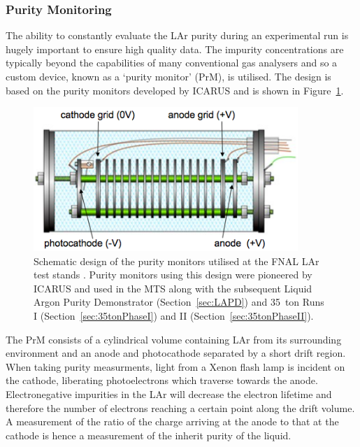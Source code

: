 \subsubsection{Purity Monitoring}\label{sec:PurityMonitoring}

The ability to constantly evaluate the LAr purity during an experimental run is hugely important to ensure high quality data.  The impurity concentrations are typically beyond the capabilities of many conventional gas analysers and so a custom device, known as a `purity monitor' (PrM), is utilised.  The design is based on the purity monitors developed by ICARUS \cite{ICARUSPurityMonitor} and is shown in Figure~\ref{fig:PurityMonitor}.

\begin{figure}
  \centering
  \includegraphics[width=10cm]{PurityMonitor.png}
  \caption[Schematic design of the purity monitors utilised at the FNAL LAr test stands.]{Schematic design of the purity monitors utilised at the FNAL LAr test stands \cite{}.  Purity monitors using this design were pioneered by ICARUS \cite{ICARUSPurityMonitor} and used in the MTS along with the subsequent Liquid Argon Purity Demonstrator (Section~\ref{sec:LAPD}) and 35~ton Runs I (Section~\ref{sec:35tonPhaseI}) and II (Section~\ref{sec:35tonPhaseII}).}
  \label{fig:PurityMonitor}
\end{figure}

The PrM consists of a cylindrical volume containing LAr from its surrounding environment and an anode and photocathode separated by a short drift region.  When taking purity measurments, light from a Xenon flash lamp is incident on the cathode, liberating photoelectrons which traverse towards the anode.  Electronegative impurities in the LAr will decrease the electron lifetime and therefore the number of electrons reaching a certain point along the drift volume.  A measurement of the ratio of the charge arriving at the anode to that at the cathode is hence a measurement of the inherit purity of the liquid.

